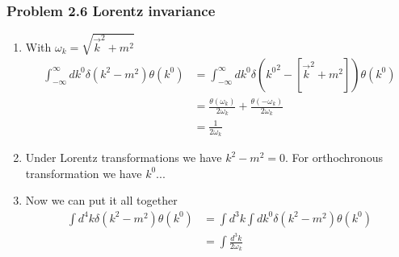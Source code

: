 \documentclass[10pt,a4paper]{article}
\theoremstyle{definition}
\begin{document}
\subsubsection{Problem 2.6 Lorentz invariance}
\begin{enumerate}
    \item With $\omega_k=\sqrt{\vec{k}^2+m^2}$
    \begin{align}
        \int_{-\infty}^\infty dk^0\delta(k^2-m^2)\theta(k^0)
        &=\int_{-\infty}^\infty dk^0\delta({k^0}^2-[\vec{k}^2+m^2])\theta(k^0)\\
        &=\frac{\theta(\omega_k)}{2\omega_k}+\frac{\theta(-\omega_k)}{2\omega_k}\\
        &=\frac{1}{2\omega_k}
    \end{align}
    \item Under Lorentz transformations we have $k^2-m^2=0$. For orthochronous transformation we have $k^0 ...$
    \item Now we can put it all together
    \begin{align}
        \int d^4k\delta(k^2-m^2)\theta(k^0)
        &=\int d^3k\int dk^0\delta(k^2-m^2)\theta(k^0)\\
        &=\int\frac{d^3k}{2\omega_k}
    \end{align}
\end{enumerate}
\end{document}
